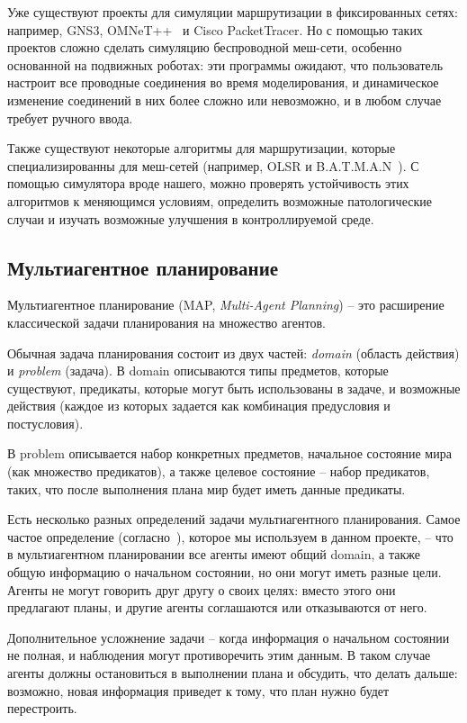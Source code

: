 \documentclass[%
]{report}
\begin{document}
Уже существуют проекты для симуляции маршрутизации в фиксированных сетях:
например, GNS3, OMNeT++~\cite{9181563} и Cisco PacketTracer.
Но с помощью таких проектов сложно сделать симуляцию беспроводной меш-сети,
особенно основанной на подвижных роботах:
эти программы ожидают, что пользователь настроит все проводные соединения
во время моделирования,
и динамическое изменение соединений в них более сложно или невозможно,
и в любом случае требует ручного ввода.

Также существуют некоторые алгоритмы для маршрутизации,
которые специализированны для меш-сетей
(например, OLSR и B.A.T.M.A.N~\cite{DBLP:journals/corr/abs-1901-02298}).
С помощью симулятора вроде нашего, можно проверять устойчивость этих алгоритмов к меняющимся условиям,
определить возможные патологические случаи
и изучать возможные улучшения
в контроллируемой среде.

\subsection{Мультиагентное планирование}

Мультиагентное планирование (MAP, \emph{Multi-Agent Planning}) --
это расширение классической задачи планирования
на множество агентов.

Обычная задача планирования состоит из двух частей:
\emph{domain} (область действия) и \emph{problem} (задача).
В domain описываются типы предметов, которые существуют,
предикаты, которые могут быть использованы в задаче,
и возможные действия (каждое из которых задается как комбинация предусловия и постусловия).

В problem описывается набор конкретных предметов,
начальное состояние мира (как множество предикатов),
а также целевое состояние -- набор предикатов, таких, что
после выполнения плана мир будет иметь данные предикаты.

Есть несколько разных определений задачи мультиагентного планирования.
Самое частое определение (согласно~\cite{doi:10.3233/MGS-2009-0133}),
которое мы используем в данном проекте, --
что в мультиагентном планировании
все агенты имеют общий domain,
а также общую информацию о начальном состоянии,
но они могут иметь разные цели.
Агенты не могут говорить друг другу о своих целях:
вместо этого они предлагают планы,
и другие агенты соглашаются или отказываются от него.

Дополнительное усложнение задачи --
когда информация о начальном состоянии не полная,
и наблюдения могут противоречить этим данным.
В таком случае агенты должны остановиться в выполнении плана
и обсудить, что делать дальше:
возможно, новая информация приведет к тому, что план нужно будет перестроить.
\end{document}
